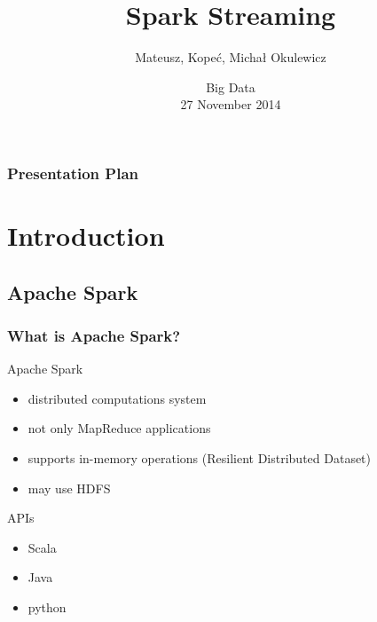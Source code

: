 \documentclass{beamer}
\title[Spark Streaming] %
{Spark Streaming}
\author %
{Mateusz, Kope{\'c}, Micha{\l} Okulewicz}
\institute %
{
Institute of Computer Science\\
Polish Academy of Sciences}
\date %
{Big Data \\27 November 2014}
\begin{document}
\begin{frame}
  \titlepage
\end{frame}

\begin{frame}
  \frametitle{Presentation Plan}
  \tableofcontents
\end{frame}

\section{Introduction}

\subsection*{Apache Spark\texttrademark}
\begin{frame}
\frametitle{What is Apache Spark\texttrademark?}

\begin{block}{Apache Spark\texttrademark}
\begin{itemize}
	\item distributed computations system
	\item not only MapReduce applications
	\item supports in-memory operations (Resilient Distributed Dataset)
	\item may use HDFS
\end{itemize}
\end{block}

\begin{block}{APIs}
\begin{itemize}
	\item Scala
	\item Java
	\item python
\end{itemize}
\end{block}

\end{frame}
\end{document}
